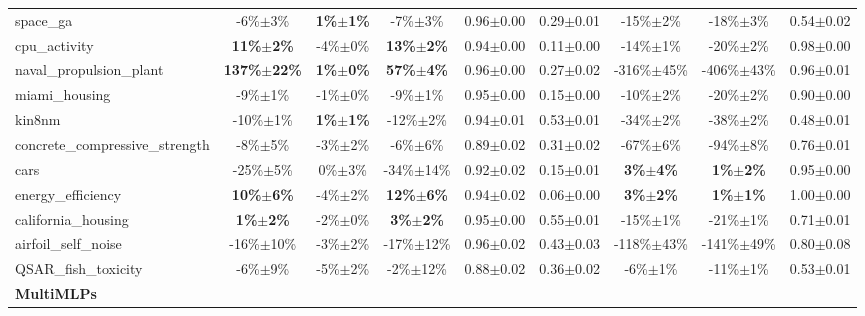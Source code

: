 \begin{table}[t]
\begin{small}
\begin{sc}
{\begin{tabular}{lcccccccc}
space\_ga  &  -6\%$\pm$3\%  &  \textbf{1\%$\pm$1\%}  &  -7\%$\pm$3\%  &  0.96$\pm$0.00  &  0.29$\pm$0.01  &  -15\%$\pm$2\%  &  -18\%$\pm$3\%  &  0.54$\pm$0.02 \\
cpu\_activity  &  \textbf{11\%$\pm$2\%}  &  -4\%$\pm$0\%  &  \textbf{13\%$\pm$2\%}  &  0.94$\pm$0.00  &  0.11$\pm$0.00  &  -14\%$\pm$1\%  &  -20\%$\pm$2\%  &  0.98$\pm$0.00 \\
naval\_propulsion\_plant  &  \textbf{137\%$\pm$22\%}  &  \textbf{1\%$\pm$0\%}  &  \textbf{57\%$\pm$4\%}  &  0.96$\pm$0.00  &  0.27$\pm$0.02  &  -316\%$\pm$45\%  &  -406\%$\pm$43\%  &  0.96$\pm$0.01 \\
miami\_housing  &  -9\%$\pm$1\%  &  -1\%$\pm$0\%  &  -9\%$\pm$1\%  &  0.95$\pm$0.00  &  0.15$\pm$0.00  &  -10\%$\pm$2\%  &  -20\%$\pm$2\%  &  0.90$\pm$0.00 \\
kin8nm  &  -10\%$\pm$1\%  &  \textbf{1\%$\pm$1\%}  &  -12\%$\pm$2\%  &  0.94$\pm$0.01  &  0.53$\pm$0.01  &  -34\%$\pm$2\%  &  -38\%$\pm$2\%  &  0.48$\pm$0.01 \\
concrete\_compressive\_strength  &  -8\%$\pm$5\%  &  -3\%$\pm$2\%  &  -6\%$\pm$6\%  &  0.89$\pm$0.02  &  0.31$\pm$0.02  &  -67\%$\pm$6\%  &  -94\%$\pm$8\%  &  0.76$\pm$0.01 \\
cars  &  -25\%$\pm$5\%  &  0\%$\pm$3\%  &  -34\%$\pm$14\%  &  0.92$\pm$0.02  &  0.15$\pm$0.01  &  \textbf{3\%$\pm$4\%}  &  \textbf{1\%$\pm$2\%}  &  0.95$\pm$0.00 \\
energy\_efficiency  &  \textbf{10\%$\pm$6\%}  &  -4\%$\pm$2\%  &  \textbf{12\%$\pm$6\%}  &  0.94$\pm$0.02  &  0.06$\pm$0.00  &  \textbf{3\%$\pm$2\%}  &  \textbf{1\%$\pm$1\%}  &  1.00$\pm$0.00 \\
california\_housing  &  \textbf{1\%$\pm$2\%}  &  -2\%$\pm$0\%  &  \textbf{3\%$\pm$2\%}  &  0.95$\pm$0.00  &  0.55$\pm$0.01  &  -15\%$\pm$1\%  &  -21\%$\pm$1\%  &  0.71$\pm$0.01 \\
airfoil\_self\_noise  &  -16\%$\pm$10\%  &  -3\%$\pm$2\%  &  -17\%$\pm$12\%  &  0.96$\pm$0.02  &  0.43$\pm$0.03  &  -118\%$\pm$43\%  &  -141\%$\pm$49\%  &  0.80$\pm$0.08 \\
QSAR\_fish\_toxicity  &  -6\%$\pm$9\%  &  -5\%$\pm$2\%  &  -2\%$\pm$12\%  &  0.88$\pm$0.02  &  0.36$\pm$0.02  &  -6\%$\pm$1\%  &  -11\%$\pm$1\%  &  0.53$\pm$0.01 \\
\cmidrule(lr){1-9}
\textbf{MultiMLPs} & & & & & & & & \\ \cmidrule(lr){1-9}


\end{tabular}}
\end{sc}
\end{small}
\end{table}
